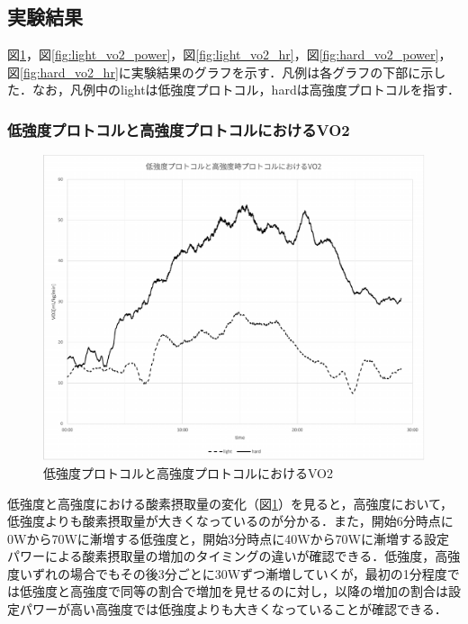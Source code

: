 \subsection{実験結果}

図\ref{fig:light_hard_vo2}，図\ref{fig:light_vo2_power}，図\ref{fig:light_vo2_hr}，図\ref{fig:hard_vo2_power}，図\ref{fig:hard_vo2_hr}に実験結果のグラフを示す．凡例は各グラフの下部に示した．なお，凡例中のlightは低強度プロトコル，hardは高強度プロトコルを指す．

\subsubsection{低強度プロトコルと高強度プロトコルにおけるVO2}

\begin{figure}[H]
  \begin{center}
    \includegraphics[width=12cm]{fig/light_hard_vo2}
    \caption{低強度プロトコルと高強度プロトコルにおけるVO2}
    \label{fig:light_hard_vo2}
  \end{center}
\end{figure}

低強度と高強度における酸素摂取量の変化（図\ref{fig:light_hard_vo2}）を見ると，高強度において，低強度よりも酸素摂取量が大きくなっているのが分かる．また，開始6分時点に0Wから70Wに漸増する低強度と，開始3分時点に40Wから70Wに漸増する設定パワーによる酸素摂取量の増加のタイミングの違いが確認できる．低強度，高強度いずれの場合でもその後3分ごとに30Wずつ漸増していくが，最初の1分程度では低強度と高強度で同等の割合で増加を見せるのに対し，以降の増加の割合は設定パワーが高い高強度では低強度よりも大きくなっていることが確認できる．

